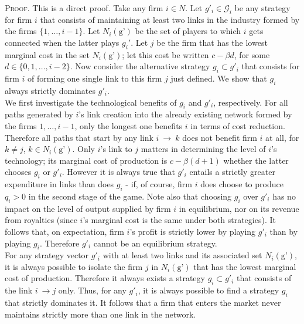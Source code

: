 \documentclass[11pt]{article}
\begin{document}
\indent \textsc{Proof.} This is a direct proof. Take any firm $i\in N$. Let $g'_i\in \mathcal{G}_i$ be any strategy for firm $i$ that consists of maintaining at least two links in the industry formed by the firms $\{1, \ldots , i-1\}$. Let $N_i(\text{g'})$ be the set of players to which $i$ gets connected when the latter plays $g_i'$. Let $j$ be the firm that has the lowest marginal cost in the set $N_i(\text{g'})$; let this cost be written $c-\beta d$, for some $d\in \{0,1, \ldots , i-2\}$. Now consider the alternative strategy $g_i\subset g'_i$ that consists for firm $i$ of forming one single link to this firm $j$ just defined. We show that $g_i$ always strictly dominates $g'_i$. \\
\indent We first investigate the technological benefits of $g_i$ and $g'_i$, respectively. For all paths generated by $i$'s link creation into the already existing network formed by the firms $1,\ldots, i-1$, only the longest one benefits $i$ in terms of cost reduction. Therefore all paths that start by any link $i~\rightarrow~ k$ does not benefit firm $i$ at all, for $k\neq j$, $k\in N_i(\text{g'})$. Only $i$'s link to $j$ matters in determining the level of $i$'s technology; its marginal cost of production is $c-\beta(d+1)$ whether the latter chooses $g_i$ or $g'_i$. However it is always true that $g'_i$ entails a strictly greater expenditure in links than does $g_i$ - if, of course, firm $i$ does choose to produce $q_i>0$ in the second stage of the game. Note also that choosing $g_i$ over $g'_i$ has no impact on the level of output supplied by firm $i$ in equilibrium, nor on its revenue from royalties (since $i$'s marginal cost is the same under both strategies). It follows that, on expectation, firm $i$'s profit is strictly lower by playing $g'_i$ than by playing $g_i$. Therefore $g'_i$ cannot be an equilibrium strategy. \\
\indent For any strategy vector $g'_i$ with at least two links and its associated set $N_i(\text{g'})$, it is always possible to isolate the firm $j$ in $N_i(\text{g'})$ that has the lowest marginal cost of production. Therefore it always exists a strategy $g_i \subset g'_i$ that consists of the link $i~\rightarrow j$ only. Thus, for any $g'_i$, it is always possible to find a strategy $g_i$ that strictly dominates it. It follows that a firm that enters the market never maintains strictly more than one link in the network. \\
\end{document}

